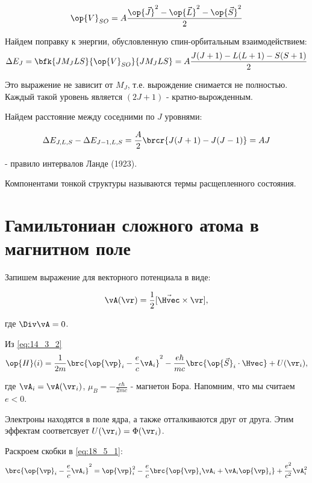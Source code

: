 \begin{equation}
\label{eq:18_4_2}
\op{V}_{SO} = A\frac{\op{\vec{J}}^2 - \op{\vec{L}}^2 - \op{\vec{S}}^2}{2}
\end{equation}

Найдем поправку к энергии, обусловленную спин-орбитальным взаимодействием:
$$
\Delta E_J = \bfk{J M_J L S}{\op{V}_{SO}}{J M_J L S} = A \frac{J(J+1) - L(L+1) - S(S+1)}{2}
$$

Это выражение не зависит от $M_J$, т.е. вырождение снимается не полностью. Каждый такой уровень является $(2J+1)$ - кратно-вырожденным.

Найдем расстояние между соседними по $J$ уровнями:

\begin{equation}
\label{eq:18_4_3}
\Delta E_{J,L,S} - \Delta E_{J-1, L, S} = \frac{A}{2}\brcr{J(J+1) - J(J-1)} = AJ
\end{equation}

- правило интервалов Ланде (1923).

Компонентами тонкой структуры называются термы расщепленного состояния.

\section{Гамильтониан сложного атома в магнитном поле}

Запишем выражение для векторного потенциала в виде:

$$
\vA(\vr) = \frac{1}{2}[\vec{\Hvec} \times \vr],
$$

где $\Div \vA = 0$.

Из \eqref{eq:14_3_2}
\begin{equation}
\label{eq:18_5_1}
\op{H}(i) = \frac{1}{2m}\brc{\op{\vp}_i - \frac{e}{c}\vA_i}^2 - \frac{e\hbar}{mc}\brc{\op{\vec{S}}_i \cdot \Hvec} + U(\vr_i),
\end{equation}

где $\vA_i = \vA(\vr_i)$, $\mu_B = -\frac{e\hbar}{2mc}$ - магнетон Бора. Напомним, что мы считаем $e < 0$.

Электроны находятся в поле ядра, а также отталкиваются друг от друга. Этим эффектам соответсвует $U(\vr_i) = \Phi(\vr_i)$.

Раскроем скобки в \eqref{eq:18_5_1}:
\begin{gather*}
\brc{\op{\vp}_i - \frac{e}{c}\vA_i}^2 = \op{\vp}_i^2 - \frac{e}{c}\brc{\op{\vp}_i \vA_i + \vA_i \op{\vp}_i} + \frac{e^2}{c^2}\vA_i^2 
\end{gather*}


